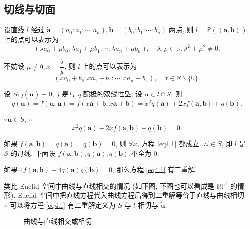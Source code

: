 \documentclass[color=black,device=normal,lang=cn,mode=geye]{elegantnote}
\begin{document}
\subsection{切线与切面}
设直线 $l$ 经过 $\tilde{\boldsymbol{a}}=(a_0:a_1:\cdots:a_n),\tilde{\boldsymbol{b}}=(b_0:b_1:\cdots:b_n)$ 两点, 则 $l=\mathbb{P}(\left<\boldsymbol{a},\boldsymbol{b}\right>)$ 上的点可以表示为
\[(\lambda a_0+\mu b_0:\lambda a_1+\mu b_1:\cdots:\lambda a_n+\mu b_n),\quad\lambda,\mu\in\mathbb{R},\lambda^2+\mu^2\neq0.\]

不妨设 $\mu\neq0,x=\dfrac{\lambda}{\mu}$, 则 $l$ 上的点可以表示为
\[(xa_0+b_0:xa_1+b_1:\cdots:xa_n+b_n),\quad x\in\mathbb{R}\backslash\{0\}.\]

设 $S:q(\tilde{\boldsymbol{u}})=0$, $f$ 是与 $q$ 配极的双线性型, 设 $\tilde{\boldsymbol{u}}\in l\cap S$, 则
\[q(\boldsymbol{u})=f(\boldsymbol{u},\boldsymbol{u})=f(x\boldsymbol{a}+\boldsymbol{b},x\boldsymbol{a}+\boldsymbol{b})=x^2q(\boldsymbol{a})+2xf(\boldsymbol{a},\boldsymbol{b})+q(\boldsymbol{b}).\]

$\because\tilde{\boldsymbol{u}}\in S$, $\therefore$
\begin{equation}\label{eq4.1}
    x^2q(\boldsymbol{a})+2xf(\boldsymbol{a},\boldsymbol{b})+q(\boldsymbol{b})=0.
\end{equation}

如果 $f(\boldsymbol{a},\boldsymbol{b})=q(\boldsymbol{a})=q(\boldsymbol{b})=0$, 则 $\forall x$, 方程 \ref{eq4.1} 都成立. $\therefore l\in S$, 即 $l$ 是 $S$ 的母线. 下面设 $f(\boldsymbol{a},\boldsymbol{b}),q(\boldsymbol{a}),q(\boldsymbol{b})$ 不全为 $0$.

如果 $4f(\boldsymbol{a},\boldsymbol{b})-4q(\boldsymbol{a})q(\boldsymbol{b})=0$, 那么方程 \ref{eq4.1} 有二重解.

类比 Euclid 空间中曲线与直线相交的情况 (如下图, 下图也可以看成是 $\mathbb{RP}^1$ 的情形). Euclid 空间中把直线方程代入曲线方程后得到二重解等价于直线与曲线相切. $\therefore$ 可以将方程 \ref{eq4.1} 有二重解定义为 $S$ 与 $l$ 相切与 $\tilde{\boldsymbol{u}}$.
\begin{figure}[h!]
    \centering
    \caption{曲线与直线相交或相切}
\end{figure}
\end{document}
